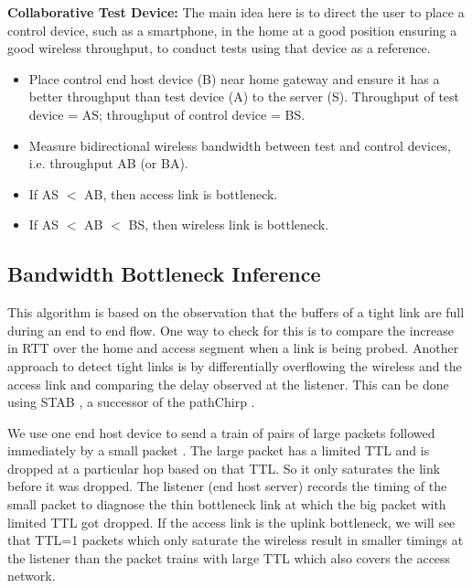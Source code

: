 \textbf{Collaborative Test Device:} The main idea here is to direct the user to place a control device, such as a smartphone, in the home at a good position ensuring a good wireless throughput, to conduct tests using that device as a reference. %
\begin{itemize}[noitemsep,topsep=0pt,parsep=0pt,partopsep=0pt]
\item Place control end host device (B) near home gateway and ensure it has a better throughput than test device (A) to the server (S). Throughput of test device = AS; throughput of control device = BS.
\item Measure bidirectional wireless bandwidth between test and control devices, i.e. throughput AB (or BA).
\item If AS $<$ AB, then access link is bottleneck.%
\item If AS $<$ AB $<$ BS, then wireless link is bottleneck.%
\end{itemize}


\subsection{Bandwidth Bottleneck Inference}
\label{latency}

This algorithm is based on the observation that the buffers of a tight link are full during an end to end flow. One way to check for this is to compare the increase in RTT over the home and access segment when a link is being probed. Another approach to detect tight links is by differentially overflowing the wireless and the access link and comparing the delay observed at the listener. This can be done using STAB \cite{stab}, a successor of the pathChirp \cite{pathchirp}.

We use one end host device to send a train of pairs of large packets followed immediately by a small packet . The large packet has a limited TTL and is dropped at a particular hop based on that TTL. So it only saturates the link before it was dropped. The listener (end host server) records the timing of the small packet to diagnose the thin bottleneck link at which the big packet with limited TTL got dropped. If the access link is the uplink bottleneck, we will see that TTL=1 packets which only saturate the wireless result in smaller timings at the listener than the packet trains with large TTL which also covers the access network.
